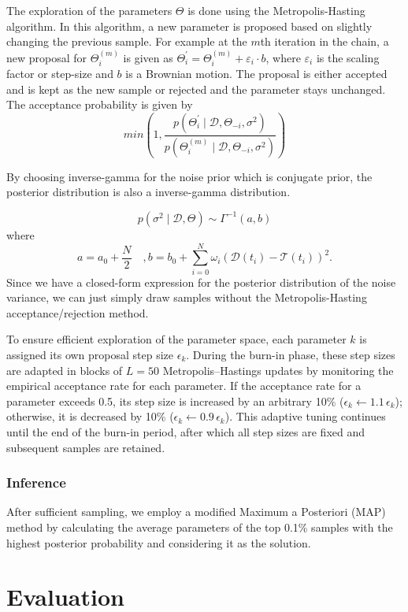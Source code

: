 The exploration of the parameters $\Theta$ is done using the Metropolis-Hasting algorithm.
In this algorithm, a new parameter is proposed based on slightly changing the previous sample.
For example at the $m$th iteration in the chain, a new proposal for $\Theta_{i}^{(m)}$ is given as $\Theta_{i}^\prime = \Theta_{i}^{(m)} + \varepsilon_{i} \cdot b$, where $\varepsilon_{i}$ is the scaling factor or step-size and $b$ is a Brownian motion.
The proposal is either accepted and is kept as the new sample or rejected and the parameter stays unchanged.
The acceptance probability is given by
\[
	min\left(1,\frac{p(\Theta_i^\prime \mid \mathcal{D}, \Theta_{-i}, \sigma^2)}{p(\Theta_i^{(m)}\mid \mathcal{D}, \Theta_{-i}, \sigma^2)}\right)
\]

By choosing inverse-gamma for the noise prior which is conjugate prior, the posterior distribution is also a inverse-gamma distribution.

\[
	p(\sigma^2 \mid \mathcal{D},\Theta) \sim \Gamma^{-1}(a, b)
\]
where
\[
	a=a_0 + \frac{N}{2} \quad, b= b_0 + \sum_{i=0}^N \omega_i(\mathcal{D}(t_i) - \mathcal{T}(t_i))^2.
\]
Since we have a closed-form expression for the posterior distribution of the noise variance, we can just simply draw samples without the Metropolis-Hasting acceptance/rejection method.

To ensure efficient exploration of the parameter space, each parameter \( k \) is assigned its own proposal step size \( \epsilon_k \).
During the burn-in phase, these step sizes are adapted in blocks of \( L = 50 \) Metropolis–Hastings updates by monitoring the empirical acceptance rate for each parameter.
If the acceptance rate for a parameter exceeds 0.5, its step size is increased by an arbitrary 10\% (\( \epsilon_k \leftarrow 1.1\,\epsilon_k \)); otherwise, it is decreased by 10\% (\( \epsilon_k \leftarrow 0.9\,\epsilon_k \)).
This adaptive tuning continues until the end of the burn-in period, after which all step sizes are fixed and subsequent samples are retained.

\subsubsection{Inference}
After sufficient sampling, we employ a modified Maximum a Posteriori (MAP) method by calculating the average parameters of the top 0.1\% samples with the highest posterior probability and considering it as the solution.



\section{Evaluation}
